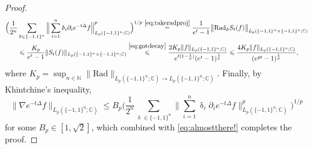 \documentclass[11pt,reqno]{amsart}
\renewcommand{\leq}{\leqslant}
\newcommand{\1}{\mathbf 1}
\theoremstyle{remark}
\newcommand{\C}{\mathbb C}
\newcommand{\N}{\mathbb N}
\renewcommand{\delta}{\updelta}
\begin{document}
\begin{proof}
\begin{equation}
\begin{split}
\Big(\frac{1}{2^n}& \sum_{\delta\in\{-1,1\}^n} \Big\| \sum_{i=1}^n \delta_i  \partial_i e^{-t\Delta} f\Big\|_{L_p(\{-1,1\}^n;\C)}^p\Big)^{1/p} \stackrel{\eqref{eq:takeradproj}}{=} \frac{1}{e^t-1} \big\|\mathrm{Rad}_\delta S_t(f)\big\|_{L_p(\{-1,1\}^n\times\{-1,1\}^n;\C)}
\\& \leq \frac{K_p}{e^t-1} \|S_t(f)\|_{L_p(\{-1,1\}^n\times\{-1,1\}^n;\C)} \stackrel{\eqref{eq:gotdecay}}{\leq} \frac{2K_p\|f\|_{L_p(\{-1,1\}^n;\C)}}{e^{t(1-\frac{1}{p})}(e^t-1)^{\frac{1}{p}}} \leq \frac{4K_p\|f\|_{L_p(\{-1,1\}^n;\C)}}{(e^{pt}-1)^{\frac{1}{p}}},
\end{split}
\end{equation}
where $K_p=\sup_{n\in\N} \|\mathrm{Rad}\|_{L_p(\{-1,1\}^n;\C)\to L_p(\{-1,1\}^n;\C)}$. Finally, by Khintchine's inequality,
\begin{equation}
\| \nabla e^{-t\Delta} f\|_{L_p(\{-1,1\}^n;\C)} \leq B_p \Big(\frac{1}{2^n} \sum_{\delta\in\{-1,1\}^n} \Big\| \sum_{i=1}^n \delta_i  \partial_i e^{-t\Delta} f\Big\|_{L_p(\{-1,1\}^n;\C)}^p\Big)^{1/p}
\end{equation}
for some $B_p\in[1,\sqrt{2}]$, which combined with \eqref{eq:almostthere!} completes the proof.
\end{proof}

\smallskip
\end{document}
